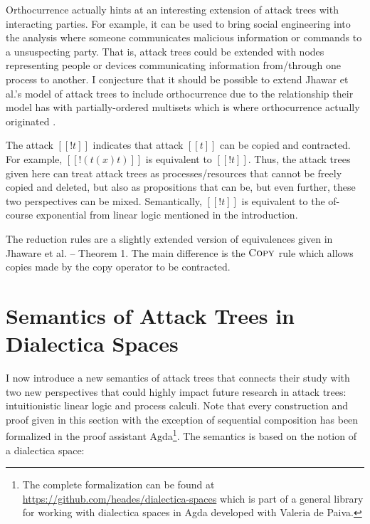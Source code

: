 \documentclass{llncs}
\begin{document}
Orthocurrence actually hints at an interesting extension of attack
trees with interacting parties.  For example, it can be used to bring
social engineering into the analysis where someone communicates
malicious information or commands to a unsuspecting party.  That is,
attack trees could be extended with nodes representing people or
devices communicating information from/through one process to
another. I conjecture that it should be possible to extend Jhawar et
al.'s model of attack trees to include orthocurrence due to the
relationship their model has with partially-ordered multisets which is
where orthocurrence actually originated \cite{?}.

The attack $[[! t]]$ indicates that attack $[[t]]$ can be copied and
contracted.  For example, $[[! (t (x) t)]]$ is equivalent to $[[!
    t]]$.  Thus, the attack trees given here can treat attack trees as
processes/resources that cannot be freely copied and deleted, but also
as propositions that can be, but even further, these two perspectives
can be mixed.  Semantically, $[[! t]]$ is equivalent to the of-course
exponential from linear logic mentioned in the introduction.

The reduction rules are a slightly extended version of equivalences
given in Jhaware et al. \cite{Jhawar:2015} -- Theorem 1.  The main
difference is the $\textsc{Copy}$ rule which allows copies made by the
copy operator to be contracted.

\section{Semantics of Attack Trees in Dialectica Spaces}
\label{sec:concrete_semantics_of_attack_trees_in_dialectica_spaces}

I now introduce a new semantics of attack trees that connects their
study with two new perspectives that could highly impact future
research in attack trees: intuitionistic linear logic and process
calculi.  Note that every construction and proof given in this section
with the exception of sequential composition has been formalized in
the proof assistant Agda\footnote{The complete formalization can be
  found at \url{https://github.com/heades/dialectica-spaces} which is
  part of a general library for working with dialectica spaces in Agda
  developed with Valeria de Paiva.}.  The semantics is based on the
notion of a dialectica space:
\end{document}
